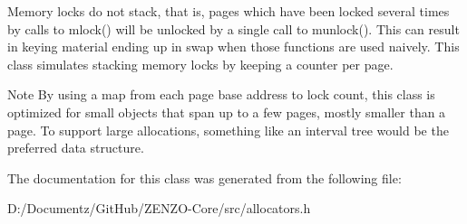 Memory locks do not stack, that is, pages which have been locked several times by calls to mlock() will be unlocked by a single call to munlock(). This can result in keying material ending up in swap when those functions are used naively. This class simulates stacking memory locks by keeping a counter per page.

\begin{DoxyNote}{Note}
By using a map from each page base address to lock count, this class is optimized for small objects that span up to a few pages, mostly smaller than a page. To support large allocations, something like an interval tree would be the preferred data structure. 
\end{DoxyNote}


The documentation for this class was generated from the following file\+:\begin{DoxyCompactItemize}
\item 
D\+:/\+Documentz/\+Git\+Hub/\+Z\+E\+N\+Z\+O-\/\+Core/src/allocators.\+h\end{DoxyCompactItemize}
